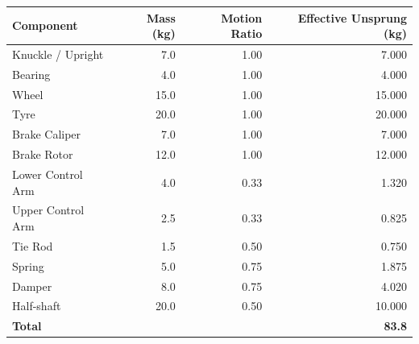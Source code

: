 \documentclass[10pt,a4paper]{article}
\begin{document}
\begin{center}\small
\begin{tabular}{@{}lrrr@{}}
\toprule
Component & Mass (kg) & Motion Ratio & Effective Unsprung (kg) \\
\midrule
Knuckle / Upright & 7.0 & 1.00 & 7.000 \\
Bearing & 4.0 & 1.00 & 4.000 \\
Wheel & 15.0 & 1.00 & 15.000 \\
Tyre & 20.0 & 1.00 & 20.000 \\
Brake Caliper & 7.0 & 1.00 & 7.000 \\
Brake Rotor & 12.0 & 1.00 & 12.000 \\
Lower Control Arm & 4.0 & 0.33 & 1.320 \\
Upper Control Arm & 2.5 & 0.33 & 0.825 \\
Tie Rod & 1.5 & 0.50 & 0.750 \\
Spring & 5.0 & 0.75 & 1.875 \\
Damper & 8.0 & 0.75 & 4.020 \\
Half-shaft & 20.0 & 0.50 & 10.000 \\
\midrule
\textbf{Total} & & & \textbf{83.8} \\
\bottomrule
\end{tabular}
\end{center}
\end{document}

